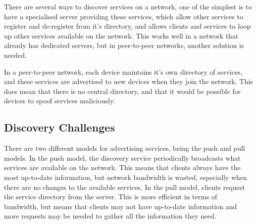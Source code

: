 There are several ways to discover services on a network, one of the simplest is to have a specialised server providing these services, which allow other services to register and de-register from it's directory, and allows clients and services to loop up other services available on the network. This works well in a network that already has dedicated servers, but in peer-to-peer networks, another solution is needed.

In a peer-to-peer network, each device maintains it's own directory of services, and these services are advertised to new devices when they join the network. This does mean that there is no central directory, and that it would be possible for devices to spoof services maliciously.

\subsection*{Discovery Challenges}

There are two different models for advertising services, being the push and pull models. In the push model, the discovery service periodically broadcasts what services are available on the network. This means that clients always have the most up-to-date information, but network bandwidth is wasted, especially when there are no changes to the available services. In the pull model, clients request the service directory from the server. This is more efficient in terms of bandwidth, but means that clients may not have up-to-date information and more requests may be needed to gather all the information they need.